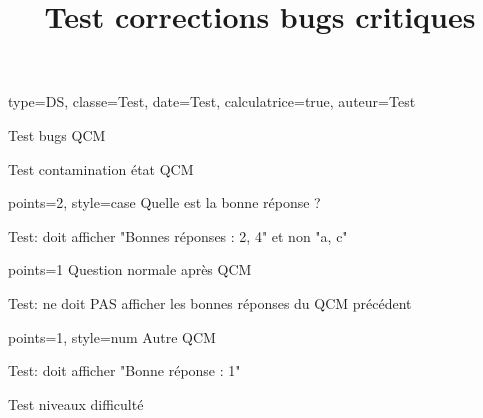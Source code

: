 \documentclass[correction=inline]{nfdevoirs}
\title{Test corrections bugs critiques}
\begin{document}
\begin{devoir}{
    type=DS,
    classe={Test},
    date={Test},
    calculatrice=true,
    auteur={Test}
}

\begin{partie}{Test bugs QCM}

    \begin{exercice}{Test contamination état QCM}

        \begin{qcm}{points=2, style=case}
            Quelle est la bonne réponse ?
            \begin{choix}
            \end{choix}
        \end{qcm}

        \begin{correction}
            Test: doit afficher "Bonnes réponses : 2, 4" et non "a, c"
        \end{correction}

        \begin{question}{points=1}
            Question normale après QCM
        \end{question}

        \begin{correction}
            Test: ne doit PAS afficher les bonnes réponses du QCM précédent
        \end{correction}

        \begin{qcm}{points=1, style=num}
            Autre QCM
            \begin{choix}
            \end{choix}
        \end{qcm}

        \begin{correction}
            Test: doit afficher "Bonne réponse : 1"
        \end{correction}

    \end{exercice}

    \begin{exercice}{Test niveaux difficulté}


\end{exercice}
\end{partie}
\end{devoir}
\end{document}
